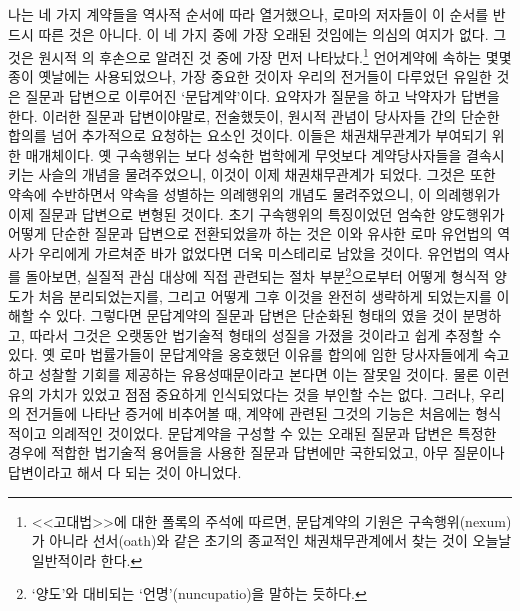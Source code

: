 나는 네 가지 계약들을 역사적 순서에 따라 열거했으나,
로마의  저자들이 이 순서를 반드시 따른 것은 아니다.
이 네 가지 중에 가장 오래된 것임에는 의심의 여지가 없다.
그것은 원시적 의 후손으로 알려진 것 중에 가장 먼저 나타났다.\footnote{%
  <<고대법>>에 대한 폴록의 주석에 따르면,
  문답계약의 기원은 구속행위(nexum)가 아니라
  선서(oath)와 같은 초기의 종교적인 채권채무관계에서 찾는 것이
  오늘날
  일반적이라 한다.
  }
언어계약에 속하는 몇몇 종이 옛날에는 사용되었으나,
가장 중요한 것이자 우리의 전거들이 다루었던 유일한 것은
질문과 답변으로 이루어진 `문답계약'이다.
요약자가 질문을 하고 낙약자가 답변을 한다.
이러한 질문과 답변이야말로, 전술했듯이,
원시적 관념이
당사자들 간의 단순한 합의를 넘어 추가적으로 요청하는 요소인 것이다.
이들은 채권채무관계가 부여되기 위한 매개체이다.
옛 구속행위는
보다 성숙한 법학에게 무엇보다
계약당사자들을 결속시키는 사슬의 개념을 물려주었으니,
이것이 이제 채권채무관계가 되었다.
그것은 또한 약속에 수반하면서 약속을 성별하는
의례행위의 개념도 물려주었으니,
이 의례행위가 이제 질문과 답변으로 변형된 것이다.
초기 구속행위의 특징이었던 엄숙한 양도행위가
어떻게 단순한 질문과 답변으로 전환되었을까 하는 것은
이와 유사한 로마 유언법의 역사가 우리에게 가르쳐준 바가 없었다면
더욱 미스테리로 남았을 것이다.
유언법의 역사를 돌아보면,
실질적 관심 대상에 직접 관련되는 절차 부분\footnote{%
  `양도'와 대비되는 `언명'(nuncupatio)을 말하는 듯하다.
}으로부터
어떻게
형식적 양도가
처음 분리되었는지를,
그리고 어떻게 그후 이것을 완전히 생략하게 되었는지를
이해할 수 있다.
그렇다면
문답계약의 질문과 답변은 단순화된 형태의 였을 것이 분명하고,
따라서
그것은 오랫동안 법기술적 형태의 성질을 가졌을 것이라고 쉽게 추정할 수 있다.
옛 로마 법률가들이 문답계약을 옹호했던 이유를
합의에 임한 당사자들에게 숙고하고 성찰할 기회를 제공하는
유용성때문이라고 본다면 이는 잘못일 것이다.
물론 이런 유의 가치가 있었고 점점 중요하게
인식되었다는 것을 부인할 수는 없다.
그러나, 우리의 전거들에 나타난 증거에 비추어볼 때,
계약에 관련된 그것의 기능은 처음에는 형식적이고 의례적인 것이었다.
문답계약을 구성할 수 있는 오래된 질문과 답변은
특정한 경우에 적합한 법기술적 용어들을 사용한
질문과 답변에만 국한되었고,
아무 질문이나 답변이라고 해서 다 되는 것이 아니었다.


